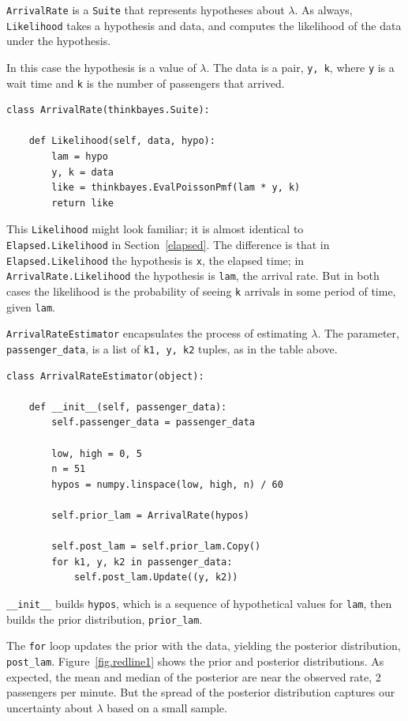 \documentclass[12pt]{book}
\begin{document}
{\tt ArrivalRate} is a {\tt Suite} that represents hypotheses about
$\lambda$.  As always, {\tt Likelihood} takes a hypothesis and data,
and computes the likelihood of the data under the hypothesis.

In this case the hypothesis is a value of $\lambda$.  The data is a
pair, {\tt y, k}, where {\tt y} is a wait time and {\tt k} is the
number of passengers that arrived.

\begin{verbatim}
class ArrivalRate(thinkbayes.Suite):

    def Likelihood(self, data, hypo):
        lam = hypo
        y, k = data
        like = thinkbayes.EvalPoissonPmf(lam * y, k)
        return like
\end{verbatim}

This {\tt Likelihood} might look familiar; it
is almost identical to {\tt Elapsed.Likelihood} in
Section~\ref{elapsed}.  The difference is that in {\tt
  Elapsed.Likelihood} the hypothesis is {\tt x}, the elapsed time; in
{\tt ArrivalRate.Likelihood} the hypothesis is {\tt lam}, the arrival
rate.  But in both cases the likelihood is the probability of seeing
{\tt k} arrivals in some period of time, given {\tt lam}.

{\tt ArrivalRateEstimator} encapsulates the process of estimating
$\lambda$.  The parameter, \verb"passenger_data", is a list
of {\tt k1, y, k2} tuples, as in the table above.

\begin{verbatim}
class ArrivalRateEstimator(object):

    def __init__(self, passenger_data):
        self.passenger_data = passenger_data

        low, high = 0, 5
        n = 51
        hypos = numpy.linspace(low, high, n) / 60

        self.prior_lam = ArrivalRate(hypos)

        self.post_lam = self.prior_lam.Copy()
        for k1, y, k2 in passenger_data:
            self.post_lam.Update((y, k2))
\end{verbatim}

\verb"__init__" builds
{\tt hypos}, which is a sequence of hypothetical values for {\tt lam},
then builds the prior distribution, \verb"prior_lam".

The {\tt for} loop updates the prior with the data, yielding the posterior
distribution, \verb "post_lam".  Figure~\ref{fig.redline1} shows
the prior and posterior distributions.  As expected, the mean and
median of the posterior are near the observed rate, 2 passengers per
minute.  But the spread of the posterior distribution captures our
uncertainty about $\lambda$ based on a small sample.
\end{document}

